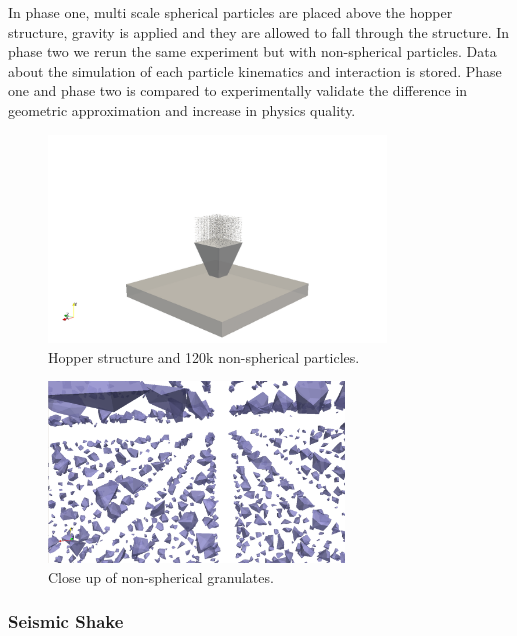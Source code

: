 \documentclass[times,12pt]{article}
\begin{document}
In phase one, multi scale spherical particles are placed above the hopper structure, gravity is applied and they are allowed to fall through the structure. In phase two we rerun the same experiment but with non-spherical particles. Data about the simulation of each particle kinematics and interaction is stored. Phase one and phase two is compared to experimentally validate the difference in geometric approximation and increase in physics quality.

\begin{figure}[!h]
\centering
\includegraphics[width=0.8\textwidth]{sketches/hopper} \protect\caption{\label{hopper} Hopper structure and 120k non-spherical particles.}
\end{figure}

\begin{figure}[!h]
\centering
\includegraphics[width=0.7\textwidth]{sketches/granulatecloseup} \protect\caption{\label{hoppercloseup}Close up of non-spherical granulates.}
\end{figure}

\clearpage

\subsubsection{Seismic Shake}
\end{document}
